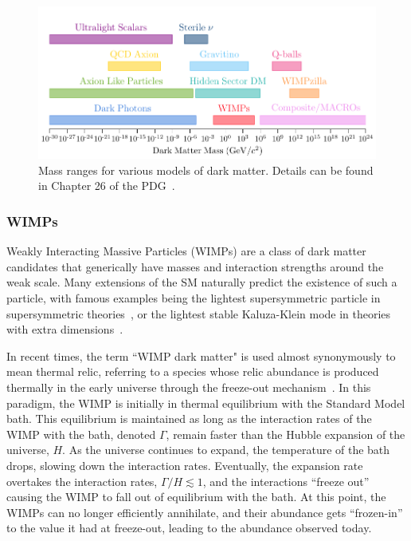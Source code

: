 \begin{figure}[t!]
    \centering
    \includegraphics{DM_model_landscape}
    \caption[Mass ranges for various models of dark matter.]{Mass ranges for various models of dark matter. Details can be found in Chapter 26 of the PDG~\cite{ParticleDataGroup:2022pth_aug_ReviewParticlePhysics}.}
    \label{ch1:fig:DM_models_landscape}
\end{figure}

\subsubsection*{WIMPs}
Weakly Interacting Massive Particles (WIMPs) are a class of dark matter candidates that generically have masses and interaction strengths around the weak scale. Many extensions of the SM naturally predict the existence of such a particle, with famous examples being the lightest supersymmetric particle in supersymmetric theories~\cite{Goldberg:1983nd_ConstraintPhotinoMass}, or the lightest stable Kaluza-Klein mode in theories with extra dimensions~\cite{Kolb:1983fm_DimensionalReductionEarly}. 

In recent times, the term ``WIMP dark matter" is used almost synonymously to mean thermal relic, referring to a species whose relic abundance is produced thermally in the early universe through the freeze-out mechanism~\cite{Jungman:1995df_Supersymmetricdarkmatter}.
In this paradigm, the WIMP is initially in thermal equilibrium with the Standard Model bath. This equilibrium is maintained as long as the interaction rates of the WIMP with the bath, denoted $\Gamma$, remain faster than the Hubble expansion of the universe, $H$. As the universe continues to expand, the temperature of the bath drops, slowing down the interaction rates. Eventually, the expansion rate overtakes the interaction rates, $\Gamma/H\lesssim 1$, and the interactions ``freeze out'' causing the WIMP to fall out of equilibrium with the bath. At this point, the WIMPs can no longer efficiently annihilate, and their abundance gets ``frozen-in'' to the value it had at freeze-out, leading to the abundance observed today. 


